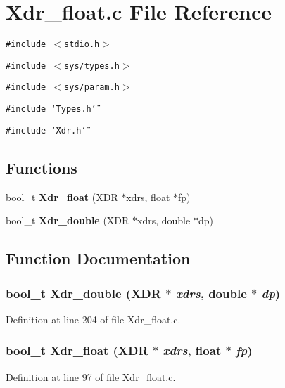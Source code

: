 \section{Xdr\_\-float.c File Reference}
\label{Xdr__float_8c}
{\tt \#include $<$stdio.h$>$}\par
{\tt \#include $<$sys/types.h$>$}\par
{\tt \#include $<$sys/param.h$>$}\par
{\tt \#include \char`\"{}Types.h\char`\"{}}\par
{\tt \#include \char`\"{}Xdr.h\char`\"{}}\par
\subsection*{Functions}
\begin{CompactItemize}
\item 
bool\_\-t {\bf Xdr\_\-float} (XDR $\ast$xdrs, float $\ast$fp)
\item 
bool\_\-t {\bf Xdr\_\-double} (XDR $\ast$xdrs, double $\ast$dp)
\end{CompactItemize}


\subsection{Function Documentation}
\subsubsection{\setlength{\rightskip}{0pt plus 5cm}bool\_\-t Xdr\_\-double (XDR $\ast$ {\em xdrs}, double $\ast$ {\em dp})}\label{Xdr__float_8c_a1}




Definition at line 204 of file Xdr\_\-float.c.
\subsubsection{\setlength{\rightskip}{0pt plus 5cm}bool\_\-t Xdr\_\-float (XDR $\ast$ {\em xdrs}, float $\ast$ {\em fp})}\label{Xdr__float_8c_a0}




Definition at line 97 of file Xdr\_\-float.c.